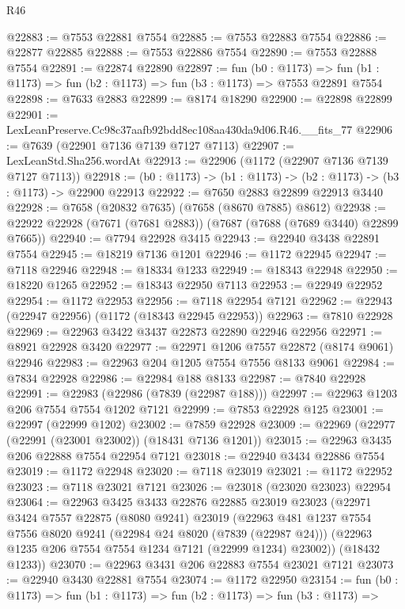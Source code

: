 \begin{lexlean}{R46}
\begin{coremodule}
@22883 := @7553 @22881 @7554
@22885 := @7553 @22883 @7554
@22886 := @22877 @22885
@22888 := @7553 @22886 @7554
@22890 := @7553 @22888 @7554
@22891 := @22874 @22890
@22897 := fun (b0 : @1173) =>
  fun (b1 : @1173) => fun (b2 : @1173) => fun (b3 : @1173) => @7553 @22891 @7554
@22898 := @7633 @2883
@22899 := @8174 @18290
@22900 := @22898 @22899
@22901 := LexLeanPreserve.Cc98c37aafb92bdd8ec108aa430da9d06.R46.__fits_77
@22906 := @7639 (@22901 @7136 @7139 @7127 @7113)
@22907 := LexLeanStd.Sha256.wordAt
@22913 := @22906 (@1172 (@22907 @7136 @7139 @7127 @7113))
@22918 := (b0 : @1173) -> (b1 : @1173) -> (b2 : @1173) -> (b3 : @1173) -> @22900 @22913
@22922 := @7650 @2883 @22899 @22913 @3440
@22928 := @7658 (@20832 @7635) (@7658 (@8670 @7885) @8612)
@22938 := @22922 @22928 (@7671 (@7681 @2883)) (@7687 (@7688 (@7689 @3440) @22899 @7665))
@22940 := @7794 @22928 @3415
@22943 := @22940 @3438 @22891 @7554
@22945 := @18219 @7136 @1201
@22946 := @1172 @22945
@22947 := @7118 @22946
@22948 := @18334 @1233
@22949 := @18343 @22948
@22950 := @18220 @1265
@22952 := @18343 @22950 @7113
@22953 := @22949 @22952
@22954 := @1172 @22953
@22956 := @7118 @22954 @7121
@22962 := @22943 (@22947 @22956) (@1172 (@18343 @22945 @22953))
@22963 := @7810 @22928
@22969 := @22963 @3422 @3437 @22873 @22890 @22946 @22956
@22971 := @8921 @22928 @3420
@22977 := @22971 @1206 @7557 @22872 (@8174 @9061) @22946
@22983 := @22963 @204 @1205 @7554 @7556 @8133 @9061
@22984 := @7834 @22928
@22986 := @22984 @188 @8133
@22987 := @7840 @22928
@22991 := @22983 (@22986 (@7839 (@22987 @188)))
@22997 := @22963 @1203 @206 @7554 @7554 @1202 @7121
@22999 := @7853 @22928 @125
@23001 := @22997 (@22999 @1202)
@23002 := @7859 @22928
@23009 := @22969 (@22977 (@22991 (@23001 @23002)) (@18431 @7136 @1201))
@23015 := @22963 @3435 @206 @22888 @7554 @22954 @7121
@23018 := @22940 @3434 @22886 @7554
@23019 := @1172 @22948
@23020 := @7118 @23019
@23021 := @1172 @22952
@23023 := @7118 @23021 @7121
@23026 := @23018 (@23020 @23023) @22954
@23064 := @22963
    @3425
    @3433
    @22876
    @22885
    @23019
    @23023
    (@22971
      @3424
      @7557
      @22875
      (@8080 @9241)
      @23019
      (@22963
        @481
        @1237
        @7554
        @7556
        @8020
        @9241
        (@22984 @24 @8020 (@7839 (@22987 @24)))
        (@22963 @1235 @206 @7554 @7554 @1234 @7121 (@22999 @1234) @23002))
      (@18432 @1233))
@23070 := @22963 @3431 @206 @22883 @7554 @23021 @7121
@23073 := @22940 @3430 @22881 @7554
@23074 := @1172 @22950
@23154 := fun (b0 : @1173) =>
  fun (b1 : @1173) =>
  fun (b2 : @1173) =>
  fun (b3 : @1173) =>

\end{coremodule}
\end{lexlean}
